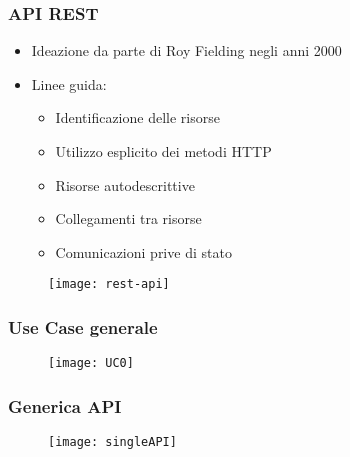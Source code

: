 \begin{frame}
  \frametitle{API REST}

  \begin{itemize}
  \item Ideazione da parte di Roy Fielding negli anni 2000
  \item Linee guida:
    \begin{itemize}
    \item Identificazione delle risorse
    \item Utilizzo esplicito dei metodi HTTP
    \item Risorse autodescrittive
    \item Collegamenti tra risorse
    \item Comunicazioni prive di stato
    \end{itemize}
  \end{itemize}

  \begin{figure}[H]
    \centering
    \texttt{[image: rest-api]}
  \end{figure}
\end{frame}

\begin{frame}

  \frametitle{Use Case generale}
  \begin{figure}[H]
    \centering
    \texttt{[image: UC0]}
  \end{figure}
\end{frame}

\begin{frame}

  \frametitle{Generica API}

  \begin{figure}[H]
    \centering
    \texttt{[image: singleAPI]}
  \end{figure}
\end{frame}
